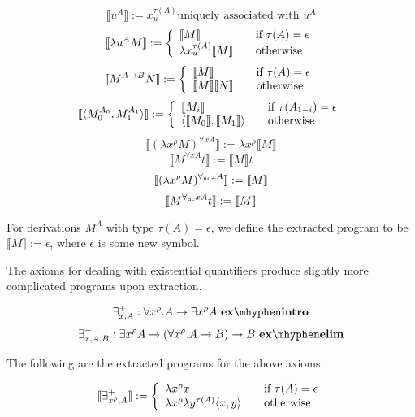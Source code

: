 \[ \llbracket u^A \rrbracket := x^{\tau (A)}_{u} \text{uniquely associated with $u^A$}
\]
\[
\llbracket \lambda u^A M \rrbracket := \left\{ 
\begin{array}{l l}
\llbracket M \rrbracket  & \quad \text{if $\tau (A) = \epsilon$} \\ 
\lambda x^{\tau (A)}_{u} \llbracket M \rrbracket & \quad \text{otherwise} \\
\end{array} \right.
 \]
\[
\llbracket M^{A \to B} N \rrbracket := \left\{ 
\begin{array}{l l}
\llbracket M \rrbracket  & \quad \text{if $\tau (A) = \epsilon$} \\ 
\llbracket M \rrbracket  \llbracket N \rrbracket & \quad \text{otherwise} \\
\end{array} \right.
 \]
\[
\llbracket \langle M^{A_0}_0, M^{A_1}_1 \rangle \rrbracket := \left\{ 
\begin{array}{l l}
\llbracket M_i \rrbracket  & \quad \text{if $\tau (A_{1-i}) = \epsilon$} \\ 
\langle \llbracket M_0 \rrbracket , \llbracket M_1 \rrbracket \rangle & \quad \text{otherwise} \\
\end{array} \right.
 \]
$$\llbracket ( \lambda x^{\rho} M)^{\forall x A} \rrbracket := \lambda x^{\rho} \llbracket   M \rrbracket$$
$$\llbracket M^{\forall x A} t \rrbracket := \llbracket M \rrbracket t$$
$$ \llbracket (\lambda x^{\rho} M)^{\forall_{\mathrm{nc}} x A} \rrbracket := \llbracket M \rrbracket $$
$$ \llbracket M^{\forall_{\mathrm{nc}} x A} t \rrbracket := \llbracket M \rrbracket  $$

For derivations $M^A$ with type $\tau(A) = \epsilon$, we define the extracted program to be $\llbracket M \rrbracket := \epsilon$, where $\epsilon$ is some new symbol. 

The axioms for dealing with existential quantifiers produce slightly more
complicated programs upon extraction. 

$$ \exists^+_{x,A} : \forall x^{\rho}.A \to \exists x^{\rho} A  \ \mathbf{ex \mhyphen intro}$$
$$ \exists^-_{x,A,B} : \exists x^{\rho} A \to (\forall x^{\rho}. A \to B) \to
B  \ \mathbf{ex \mhyphen elim}$$

The following are the extracted programs for the above axioms.

\[ \llbracket \exists^{+}_{x^{\rho}, A} \rrbracket := \left\{ 
\begin{array}{l l}
\lambda x^{\rho} x  & \quad \text{if $\tau (A) = \epsilon$} \\ 
\lambda x^{\rho} \lambda y^{\tau (A)} \langle x,y \rangle & \quad \text{otherwise} \\

\end{array} \right.
\]

